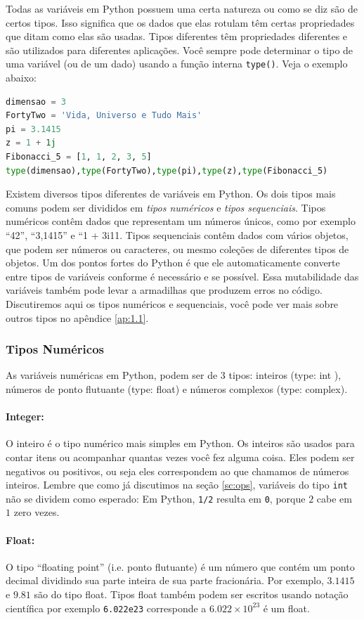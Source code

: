 Todas as variáveis em Python possuem uma certa natureza ou como se diz são de certos tipos. Isso significa que os dados que elas rotulam têm certas propriedades que ditam como elas são usadas. Tipos diferentes têm propriedades diferentes e são utilizados para diferentes aplicações. Você sempre pode determinar o tipo de uma variável (ou de um dado) usando a função interna {\tt type()}. Veja o exemplo abaixo:
\begin{lstlisting}[language=Python]
dimensao = 3
FortyTwo = 'Vida, Universo e Tudo Mais'
pi = 3.1415
z = 1 + 1j
Fibonacci_5 = [1, 1, 2, 3, 5]
type(dimensao),type(FortyTwo),type(pi),type(z),type(Fibonacci_5)
\end{lstlisting}

Existem diversos tipos diferentes de variáveis em Python. Os dois tipos mais comuns 
podem ser divididos em {\it tipos numéricos} e {\it tipos sequenciais}. Tipos numéricos
contêm dados que representam um números únicos, como por exemplo ``42'', ``3,1415'' e ``1 + 3i11. Tipos sequenciais contêm dados com vários objetos, que podem ser números ou
caracteres, ou mesmo coleções de diferentes tipos de objetos. Um dos pontos fortes do Python é que ele automaticamente converte entre tipos de variáveis conforme é necessário e se possível. Essa mutabilidade das variáveis também pode levar a armadilhas que produzem erros no código. Discutiremos aqui os tipos numéricos e sequenciais, você pode ver mais sobre outros tipos no apêndice \ref{ap:1.1}.

\subsubsection{Tipos Numéricos}
As variáveis numéricas em Python, podem ser de 3 tipos: inteiros (type: int ), números de ponto flutuante (type: float) e números complexos (type: complex).

\paragraph{Integer:} O inteiro é o tipo numérico mais simples em Python. Os inteiros são
usados para contar itens ou acompanhar quantas vezes você fez alguma coisa. Eles podem ser negativos ou positivos, ou seja eles correspondem ao que chamamos de números inteiros. Lembre que como já discutimos na seção \ref{sc:ops}, variáveis do tipo {\tt int} não se dividem como esperado: Em Python, {\tt 1/2} resulta em {\tt 0}, porque $2$ cabe em $1$ zero vezes.
\paragraph{Float:} O tipo “floating point” (i.e. ponto flutuante) é um número que contém um ponto decimal dividindo sua parte inteira de sua parte fracionária. Por exemplo, $3.1415$ e $9.81$ são do tipo float. Tipos float também podem ser escritos usando notação científica por exemplo {\tt 6.022e23} corresponde a $6.022 \times 10^23$ é um float. 
